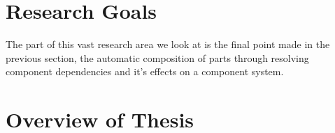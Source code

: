 \documentclass{report}
\begin{document}
\section{Research Goals}
{}The part of this vast research area we look at is the final point made in the previous section, 
{}the automatic composition of parts through resolving component dependencies and it's effects on a component system.


\section{Overview of Thesis}
















\end{document}
